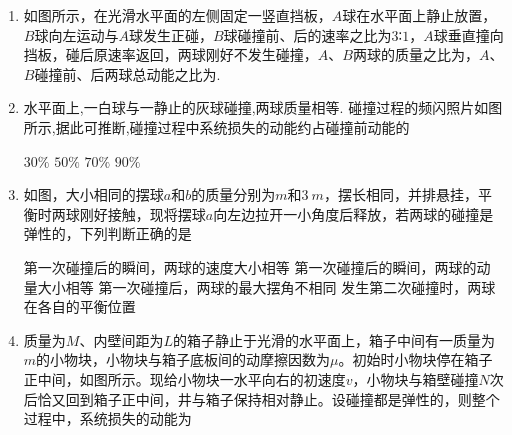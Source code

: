 

\begin{enumerate}[leftmargin=0em]
\renewcommand{\labelenumi}{\arabic{enumi}.}
\item
{}
如图所示，在光滑水平面的左侧固定一竖直挡板，$ A $球在水平面上静止放置，$ B $球向左运动与$ A $球发生正碰，$ B $球碰撞前、后的速率之比为$ 3 $∶$ 1 $，$ A $球垂直撞向挡板，碰后原速率返回，两球刚好不发生碰撞，$ A $、$ B $两球的质量之比为，$ A $、$ B $碰撞前、后两球总动能之比为.


\item
{}
水平面上,一白球与一静止的灰球碰撞,两球质量相等. 碰撞过程的频闪照片如图所示,据此可推断,碰撞过程中系统损失的动能约占碰撞前动能的  
\begin{figure}[h!]
\centering

\end{figure}



 
\fourchoices
{$ 30 \% $}
{$ 50 \% $}
{$ 70 \% $}
{$ 90 \% $}




\item
{}
如图，大小相同的摆球$ a $和$ b $的质量分别为$ m $和$ 3 \ m $，摆长相同，并排悬挂，平衡时两球刚好接触，现将摆球$ a $向左边拉开一小角度后释放，若两球的碰撞是弹性的，下列判断正确的是  


\begin{minipage}[h!]{0.7\linewidth}
\vspace{0.3em}
\fourchoices
{第一次碰撞后的瞬间，两球的速度大小相等}
{第一次碰撞后的瞬间，两球的动量大小相等}
{第一次碰撞后，两球的最大摆角不相同}
{发生第二次碰撞时，两球在各自的平衡位置}
\vspace{0.3em}
\end{minipage}
\hfill
\begin{minipage}[h!]{0.3\linewidth}
\flushright
\vspace{0.3em}

\vspace{0.3em}
\end{minipage}




\item 
{}
质量为$ M $、内壁间距为$ L $的箱子静止于光滑的水平面上，箱子中间有一质量为$ m $的小物块，小物块与箱子底板间的动摩擦因数为$ \mu $。初始时小物块停在箱子正中间，如图所示。现给小物块一水平向右的初速度$ v $，小物块与箱壁碰撞$ N $次后恰又回到箱子正中间，井与箱子保持相对静止。设碰撞都是弹性的，则整个过程中，系统损失的动能为  
\begin{figure}[h!]
\centering

\end{figure}


\end{enumerate}
